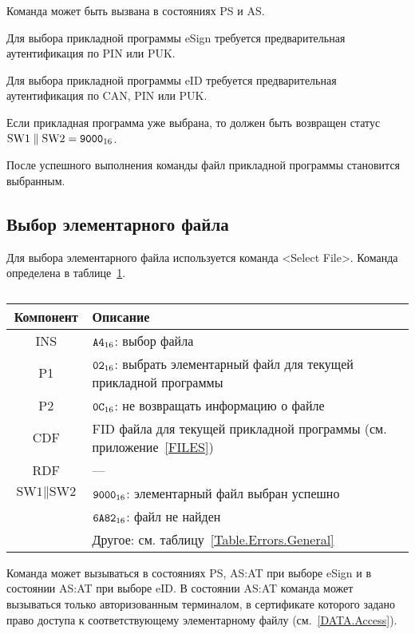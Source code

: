 Команда может быть вызвана в состояниях PS и AS.

Для выбора прикладной программы eSign требуется
предварительная аутентификация по PIN или PUK.

Для выбора прикладной программы eID требуется
предварительная аутентификация по CAN, PIN или PUK.

Если прикладная программа уже выбрана, то должен быть возвращен
статус $\text{SW1} \parallel \text{SW2} = \texttt{9000}_{16}$.

После успешного выполнения команды файл прикладной программы 
становится выбранным.

\subsection{Выбор элементарного файла}
\label{Oper.Descr.SelectEF}

Для выбора элементарного файла используется команда <Select File>. 
Команда определена в таблице~\ref{Table.Oper.SelectEFCmd}.

\begin{table}[hbt]
\caption{}\label{Table.Oper.SelectEFCmd}
\begin{tabular}{|c|p{14cm}|}
\hline
Компонент & Описание \\
\hline
\hline
INS & $\texttt{A4}_{16}$: выбор файла\\ 
\hline
P1 & $\texttt{02}_{16}$: выбрать элементарный файл для текущей прикладной программы\\
\hline
P2 & $\texttt{0C}_{16}$: не возвращать информацию о файле\\
\hline
CDF & FID файла для текущей прикладной программы (см. приложение~\ref{FILES})\\
\hline 
\hline
RDF &  --- \\
\hline
$\text{SW1}\parallel\text{SW2}$ & 
$\texttt{9000}_{16}$: элементарный файл выбран успешно \\
\cline{2-2}
  & $\texttt{6A82}_{16}$: файл не найден \\
\cline{2-2}
  & Другое: см. таблицу~\ref{Table.Errors.General}\\
\hline
\end{tabular}
\end{table}

Команда может вызываться в состояниях PS, AS:AT 
при выборе eSign и в состоянии AS:AT при выборе eID. 
В состоянии AS:AT команда может вызываться только 
авторизованным терминалом, в сертификате которого
задано право доступа к соответствующему элементарному файлу 
(см.~\ref{DATA.Access}).

